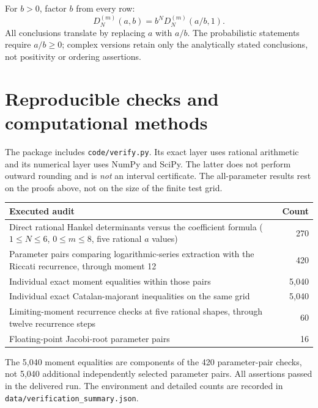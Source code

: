 \documentclass[11pt,a4paper]{article}
\numberwithin{equation}{section}
\theoremstyle{definition}
\theoremstyle{remark}
\begin{document}
For $b>0$, factor $b$ from every row:
\begin{equation}
 D_N^{(m)}(a,b)=b^N D_N^{(m)}(a/b,1).
\end{equation}
All conclusions translate by replacing $a$ with $a/b$. The probabilistic
statements require $a/b\ge0$; complex versions retain only the analytically
stated conclusions, not positivity or ordering assertions.

\section{Reproducible checks and computational methods}
\label{gs:sec:checks}

The package includes \texttt{code/verify.py}. Its exact layer uses rational
arithmetic and its numerical layer uses NumPy and SciPy. The latter does
not perform outward rounding and is \emph{not} an interval certificate.
The all-parameter results rest on the proofs above, not on the size of the
finite test grid.

\begin{center}
\renewcommand{\arraystretch}{1.2}
\begin{tabular}{@{}p{.63\linewidth}r@{}}
\toprule
Executed audit & Count\\
\midrule
Direct rational Hankel determinants versus the coefficient formula
($1\le N\le6$, $0\le m\le8$, five rational $a$ values) & 270\\
Parameter pairs comparing logarithmic-series extraction with the
Riccati recurrence, through moment 12 & 420\\
Individual exact moment equalities within those pairs & 5,040\\
Individual exact Catalan-majorant inequalities on the same grid & 5,040\\
Limiting-moment recurrence checks at five rational shapes,
through twelve recurrence steps & 60\\
Floating-point Jacobi-root parameter pairs & 16\\
\bottomrule
\end{tabular}
\end{center}
The 5,040 moment equalities are components of the 420 parameter-pair checks,
not 5,040 additional independently selected parameter pairs.
All assertions passed in the delivered run. The environment and detailed
counts are recorded in \texttt{data/verification\_summary.json}.

\end{document}
